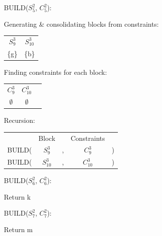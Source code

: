 \documentclass[11pt]{article} %
\begin{document}
	\hspace{0.5cm}BUILD($S_5^2$, $C_5^2$):
		\begin{center}
		Generating \& consolidating blocks from constraints:
		
		\begin{tabular}{c c}
			\hspace{0.8cm}$S_9^3$\hspace{0.8cm} & \hspace{0.8cm}$S_{10}^3$\hspace{0.8cm} \\
			\{g\} & \{b\}
		\end{tabular}
	
		Finding constraints for each block:
		
		\begin{tabular}{c c c}
			\hspace{0.8cm}$C_9^3$\hspace{0.8cm} & \hspace{0.8cm}$C_{10}^3$\hspace{0.8cm} \\
			$\emptyset$ & $\emptyset$
		\end{tabular}

		Recursion:
		
		\begin{tabular}{c c c c c}
			 & Block & & Constraints & \\
			BUILD( & $S_9^3$ & , & $C_9^3$ & ) \\
			BUILD( & $S_{10}^3$ & , & $C_{10}^3$ & )
		\end{tabular}
		\end{center}

	\hspace{0.5cm}BUILD($S_6^2$, $C_6^2$):
		\begin{center}
		Return k
		\end{center}

	\hspace{0.5cm}BUILD($S_7^2$, $C_7^2$):
		\begin{center}
		Return m
		\end{center}


\subsubsection{}
\end{document}
